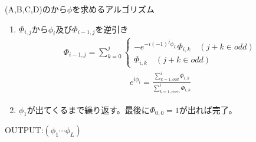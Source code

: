 \documentclass[a4paper,10.5pt]{article}
\numberwithin{equation}{section}
\begin{document}
\begin{setupbox}{(A,B,C,D)のから$\phi$を求めるアルゴリズム}
\begin{enumerate}
    \begin{align*}
        e^{i\phi_{L}}
        =\frac{\sum_{k=1,odd}^{L}\Phi_{L,k}}{\sum_{k=1,even}^{L}\Phi_{L,k}}
        =\frac{c_{2[\frac{L}{2}]-1}+id_{2[\frac{L}{2}]-1}}{(-1)^{[\frac{L}{2}]}(a_{L}+ib_{L})}
    \end{align*}
    \item $\Phi_{i,j}$から$\phi_{i}$及び$\Phi_{i-1,j}$を逆引き
     \begin{align*}
        \Phi_{i-1,j}=\sum_{k=0}^{j}\begin{cases}
            -e^{-i(-1)^{j}\phi_{L}}\Phi_{i,k}\quad (j+k\in odd)\\
            \Phi_{i,k}\quad (j+k\in odd)
        \end{cases}
    \end{align*}
    \begin{align*}
        e^{i\phi_{i}}
        =\frac{\sum_{k=1,odd}^{i}\Phi_{i,k}}{\sum_{k=1,even}^{i}\Phi_{i,k}}
    \end{align*}
    \item $\phi_{1}$が出てくるまで繰り返す。最後に$\Phi_{0,0}=1$が出れば完了。
\end{enumerate}
OUTPUT:$(\phi_{1}\cdots \phi_{L})$
\end{setupbox}
\end{document}
